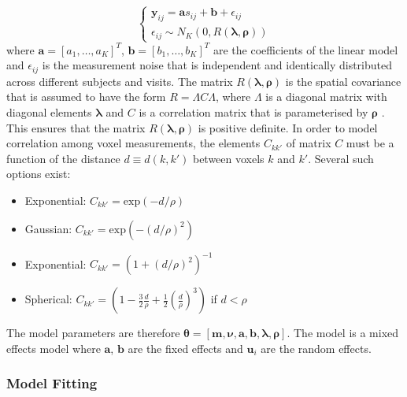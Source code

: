 \begin{equation}
 \begin{cases}
  \textbf{y}_{ij} = \textbf{a}s_{ij}+\textbf{b}+\epsilon_{ij}\\
  \epsilon_{ij} \sim N_K(0,R(\boldsymbol{\lambda},\boldsymbol{\rho}))
 \end{cases}
\end{equation}
where $\textbf{a} = [a_1, \dots, a_K]^T$, $\textbf{b} = [b_1, \dots, b_K]^T$ are the coefficients of the linear model and $\epsilon_{ij}$ is the measurement noise that is independent and identically distributed across different subjects and visits. The matrix $R(\boldsymbol{\lambda},\boldsymbol{\rho})$ is the spatial covariance that is assumed to have the form $R = \Lambda C \Lambda$, where $\Lambda$ is a diagonal matrix with diagonal elements $\boldsymbol{\lambda}$ and $C$ is a correlation matrix that is parameterised by $\boldsymbol{\rho}$ \cite{bilgel2016multivariate}. This ensures that the matrix $R(\boldsymbol{\lambda},\boldsymbol{\rho})$ is positive definite. In order to model correlation among voxel measurements, the elements $C_{kk'}$ of matrix $C$ must be a function of the distance $d \equiv d(k,k')$ between voxels $k$ and $k'$. Several such options exist:
\begin{itemize}
 \item Exponential: $C_{kk'} = \text{exp}(-d/\rho)$
 \item Gaussian: $C_{kk'} = \text{exp}(-(d/\rho)^2)$
 \item Exponential: $C_{kk'} = \left(1+(d/\rho)^2\right)^{-1}$
 \item Spherical: $C_{kk'} = \left( 1 - \frac{3}{2}\frac{d}{\rho} + \frac{1}{2}\left(\frac{d}{\rho}\right)^{3} \right)$ if $d<\rho$
\end{itemize}
The model parameters are therefore $\boldsymbol{\theta} = [\textbf{m},\boldsymbol{\nu},\textbf{a},\textbf{b},\boldsymbol{\lambda},\boldsymbol{\rho}]$. The model is a mixed effects model where $\textbf{a}$, $\textbf{b}$ are the fixed effects and $\textbf{u}_i$ are the random effects. 

\subsubsection{Model Fitting}

